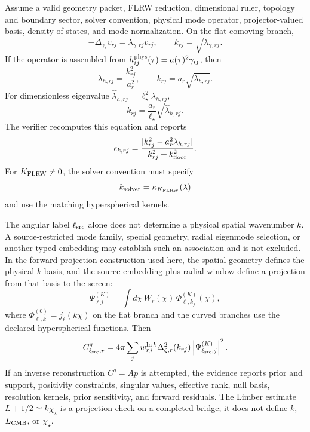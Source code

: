\begin{theorem}\label{thm:physical-comoving-k}
Assume a valid geometry packet, FLRW reduction, dimensional ruler, topology and boundary sector,
solver convention, physical mode operator, projector-valued basis, density of states, and mode
normalization.  On the flat comoving branch,
\[
-\Delta_{\gamma_r}v_{rj}=\lambda_{\gamma,rj}v_{rj},\qquad
k_{rj}=\sqrt{\lambda_{\gamma,rj}}.
\]
If the operator is assembled from \(h_{ij}^{\rm phys}(\tau)=a(\tau)^2\gamma_{ij}\), then
\[
\lambda_{h,rj}=\frac{k_{rj}^2}{a_r^2},\qquad
k_{rj}=a_r\sqrt{\lambda_{h,rj}}.
\]
For dimensionless eigenvalue \(\widehat\lambda_{h,rj}=\ell_\star^2\lambda_{h,rj}\),
\[
k_{rj}=\frac{a_r}{\ell_\star}\sqrt{\widehat\lambda_{h,rj}}.
\]
The verifier recomputes this equation and reports
\[
\epsilon_{k,rj}
=
\frac{|k_{rj}^2-a_r^2\lambda_{h,rj}|}{k_{rj}^2+k_{\rm floor}^2}.
\]
For \(K_{\rm FLRW}\ne0\), the solver convention must specify
\[
k_{\rm solver}=\kappa_{K_{\rm FLRW}}(\lambda)
\]
and use the matching hyperspherical kernels.
\end{theorem}

\begin{theorem}\label{thm:screen-to-spatial-mode-association}
The angular label \(\ell_{\rm src}\) alone does not determine a physical
spatial wavenumber \(k\). A source-restricted mode family, special geometry,
radial eigenmode selection, or another typed embedding may establish such an
association and is not excluded. In the forward-projection construction used
here, the spatial geometry defines the physical \(k\)-basis, and the source
embedding plus radial window define a projection
from that basis to the screen:
\[
\Psi_{\ell j}^{(K)}=
\int d\chi\,W_r(\chi)\,\Phi_{\ell,k_j}^{(K)}(\chi),
\]
where \(\Phi_{\ell,k}^{(0)}=j_\ell(k\chi)\) on the flat branch and the curved branches use the
declared hyperspherical functions.  Then
\[
C_{\ell_{\rm src},r}^{q}
=4\pi\sum_j w_{rj}^{\ln k}
\Delta_{\zeta,r}^{2}(k_{rj})
\left|\Psi_{\ell_{\rm src},j}^{(K)}\right|^2.
\]
If an inverse reconstruction \(C^q=Ap\) is attempted, the evidence reports prior and support,
positivity constraints, singular values, effective rank, null basis, resolution kernels, prior
sensitivity, and forward residuals.  The Limber estimate \(L+1/2\simeq k\chi_\star\) is a
projection check on a completed bridge; it does not define \(k\), \(L_{\rm CMB}\), or \(\chi_\star\).
\end{theorem}

